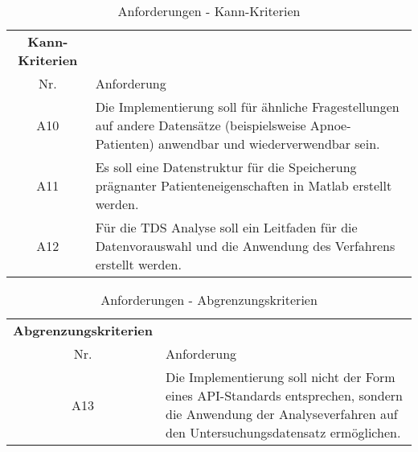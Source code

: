 \begin{table}[H] 
\begin{tabularx}{\textwidth}{cllX}
\toprule
\multicolumn{3}{c}{\textbf{Kann-Kriterien}} & \\  
\cmidrule{1-3}
\multicolumn{3}{c}{Nr.} & Anforderung\\ 
\midrule 
\multicolumn{3}{c}{A10} &  Die Implementierung soll für ähnliche Fragestellungen auf andere Datensätze (beispielsweise Apnoe-Patienten) anwendbar und wiederverwendbar sein.\\
\multicolumn{3}{c}{A11} & Es soll eine Datenstruktur für die Speicherung prägnanter Patienteneigenschaften in Matlab erstellt werden.\\
\multicolumn{3}{c}{A12} & Für die \acs{TDS} Analyse soll ein Leitfaden für die Datenvorauswahl und die Anwendung des Verfahrens erstellt werden.\\ 
\bottomrule
\end{tabularx}
\caption{Anforderungen - Kann-Kriterien}
\label{tab:Kann-Kriterien}
\end{table}


\begin{table}[H] 
\begin{tabularx}{\textwidth}{cllX}
\toprule
\multicolumn{3}{c}{\textbf{Abgrenzungskriterien}} & \\  
\cmidrule{1-3}
\multicolumn{3}{c}{Nr.} & Anforderung\\ 
\midrule 
\multicolumn{3}{c}{A13} &  Die Implementierung soll nicht der Form eines API-Standards entsprechen, sondern die Anwendung der Analyseverfahren auf den Untersuchungsdatensatz ermöglichen.\\
\bottomrule
\end{tabularx}
\caption{Anforderungen - Abgrenzungskriterien}
\label{tab:Abgr-Kriterien}
\end{table}
